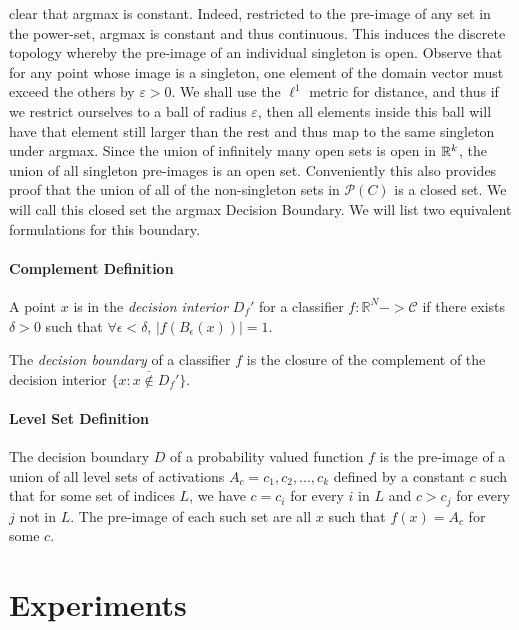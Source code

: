 clear that argmax is constant.  Indeed, restricted to the pre-image of
any set in the power-set, argmax is constant and thus
continuous. This induces the discrete topology whereby the pre-image
of an individual singleton is open. Observe that for any point whose
image is a singleton, one element of the domain vector must exceed the 
others by $\varepsilon > 0$. We shall use the $\ell^1$ metric for
distance, and thus if we restrict ourselves to a ball of radius
$\varepsilon$, then all elements inside this ball will have that
element still larger than the rest and thus map to the same singleton
under argmax. Since the union of infinitely many open sets is open in
$\mathbb{R}^k$, the union of all singleton pre-images is an open
set. Conveniently this also provides proof that the union of all of
the non-singleton sets in $\mathcal{P}(C)$ is a closed set. We will
call this closed set the argmax Decision Boundary. We will list two
equivalent formulations for this boundary.  

\paragraph{Complement Definition}

A point $x$ is in the \emph{decision interior} $D_f'$ for a classifier $f: \mathbb{R}^N -> \mathcal{C}$ if there exists $\delta > 0$ such that $\forall \epsilon < \delta$, $|f(B_\epsilon(x))| = 1$. 

The \emph{decision boundary} of a classifier $f$ is the closure of the complement of the decision interior $\overline{\{x : x \notin D_f'\}}$. 

\paragraph{Level Set Definition}

The decision boundary $D$ of a probability valued function $f$ is the pre-image of a union of all level sets of activations $A_c = {c_1, c_2, ..., c_k}$ defined by a constant $c$ such that for some set of indices $L$, we have $c = c_i$ for every $i$ in $L$ and $c > c_j$ for every $j$ not in $L$. The pre-image of each such set are all $x$ such that $f(x) = A_c$ for some $c$. 



\section{Experiments} \label{sec:experiments}

